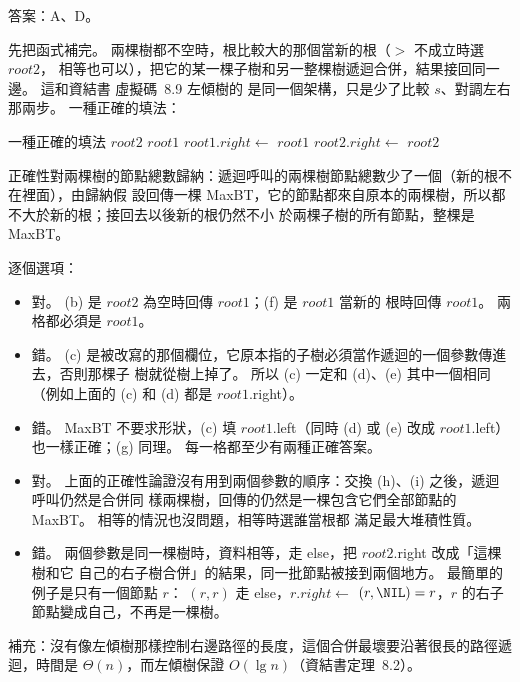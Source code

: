 \begin{pastsoln}
答案：A、D。

先把函式補完。 兩棵樹都不空時，根比較大的那個當新的根（$>$ 不成立時選 $\mathit{root2}$，
相等也可以），把它的某一棵子樹和另一整棵樹遞迴合併，結果接回同一邊。 這和資結書
虛擬碼~8.9 左傾樹的  是同一個架構，只是少了比較 $s$、對調左右那兩步。
一種正確的填法：

\begin{pseudo}[unbreakable]{一種正確的填法}
     \Return $\mathit{root2}$  \EndIf
     \Return $\mathit{root1}$  \EndIf
        \State $\mathit{root1}.\mathit{right} \gets$  
        \State \Return $\mathit{root1}$ 
    \Else
        \State $\mathit{root2}.\mathit{right} \gets$  
        \State \Return $\mathit{root2}$ 
    \EndIf
\EndFunction
\end{pseudo}

正確性對兩棵樹的節點總數歸納：遞迴呼叫的兩棵樹節點總數少了一個（新的根不在裡面），由歸納假
設回傳一棵 MaxBT，它的節點都來自原本的兩棵樹，所以都不大於新的根；接回去以後新的根仍然不小
於兩棵子樹的所有節點，整棵是 MaxBT。

逐個選項：
\begin{itemize}
\item[A.] 對。 (b) 是 $\mathit{root2}$ 為空時回傳 $\mathit{root1}$；(f) 是 $\mathit{root1}$ 當新的
根時回傳 $\mathit{root1}$。 兩格都必須是 $\mathit{root1}$。
\item[B.] 錯。 (c) 是被改寫的那個欄位，它原本指的子樹必須當作遞迴的一個參數傳進去，否則那棵子
樹就從樹上掉了。 所以 (c) 一定和 (d)、(e) 其中一個相同（例如上面的 (c) 和 (d) 都是
$\mathit{root1}$.right）。
\item[C.] 錯。 MaxBT 不要求形狀，(c) 填 $\mathit{root1}$.left（同時 (d) 或 (e) 改成
$\mathit{root1}$.left）也一樣正確；(g) 同理。 每一格都至少有兩種正確答案。
\item[D.] 對。 上面的正確性論證沒有用到兩個參數的順序：交換 (h)、(i) 之後，遞迴呼叫仍然是合併同
樣兩棵樹，回傳的仍然是一棵包含它們全部節點的 MaxBT。 相等的情況也沒問題，相等時選誰當根都
滿足最大堆積性質。
\item[E.] 錯。 兩個參數是同一棵樹時，資料相等，走 else，把 $\mathit{root2}$.right 改成「這棵樹和它
自己的右子樹合併」的結果，同一批節點被接到兩個地方。 最簡單的例子是只有一個節點 $r$：
$(r, r)$ 走 else，$r.\mathit{right} \gets$
$(r, \NIL) = r$，$r$ 的右子節點變成自己，不再是一棵樹。
\end{itemize}

補充：沒有像左傾樹那樣控制右邊路徑的長度，這個合併最壞要沿著很長的路徑遞迴，時間是
$\Theta(n)$，而左傾樹保證 $O(\lg n)$（資結書定理~8.2）。
\end{pastsoln}
